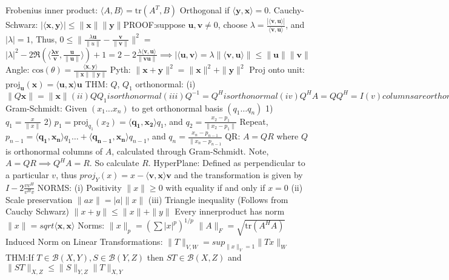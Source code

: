 \documentclass[8pt]{extarticle}
\theoremstyle{definition}
\begin{document}
{Frobenius inner product: $\langle A, B \rangle = \text{tr}(A^T,B)$
Orthogonal if $\langle \mathbf{y}, \mathbf{x} \rangle = 0$.
Cauchy-Schwarz: $|\langle \mathbf{x}, \mathbf{y} \rangle | \leq \|\mathbf{x}\| \|\mathbf{y}\|$PROOF:suppose $\mathbf{u}, \mathbf{v} \neq 0$, choose
$\lambda = \frac{|\langle \mathbf{v}, \mathbf{u} \rangle |}{\langle \mathbf{v}, \mathbf{u} \rangle }$, and $|\lambda| = 1$,
Thus, $0 \leq \| \frac{\lambda \mathbf{u}}{\|u\|} - \frac{\mathbf{v}}{\|\mathbf{v}\|}\|^2 = $
$|\lambda|^2 -2 \Re(\langle \mathbf{\frac{\lambda \mathbf{v}}{\mathbf{v}}},
\frac{\mathbf{u}}{\|\mathbf{u}\|} \rangle ) + 1 = 2 - 2 \frac{\lambda \langle \mathbf{v}, \mathbf{u} \rangle }{\|\mathbf{v}\mathbf{u}\|} \implies |\langle \mathbf{u}, \mathbf{v} \rangle 
= \lambda \| \langle \mathbf{v}, \mathbf{u} \rangle \| \leq \|\mathbf{u}\| \| \mathbf{v}\|$ 
Angle: $ \text{cos}(\theta) = \frac{\langle \mathbf{x}, \mathbf{y} \rangle }{\| \mathbf{x}\| \|\mathbf{y}\|}$ 
Pyth: $\|\mathbf{x}+ \mathbf{y}\|^2 = \|\mathbf{x}\|^2 + \|\mathbf{y}\|^2$
Proj onto unit: $\text{proj}_\mathbf{u}(\mathbf{x}) = \langle \mathbf{u}, \mathbf{x} \rangle \mathbf{u}$
THM: $Q$, $Q_1$ orthonormal: (i) $\|Q \mathbf{x}\| = \|\mathbf{x}\| 
(ii) QQ_1 is orthonormal
(iii) Q^{-1} = Q^H is orthonormal
(iv) Q^HA = QQ^H = I
(v) columns are orthonormal
(vi) |det(Q)| = 1$
Gram-Schmidt: Given $(x_1\dots x_n)$ to get orthonormal basis $(q_1 \dots q_n)$ 1) $q_1 = \frac{x}{\|x\|}$ 
2) $p_1 = \text{proj}_{q_1}(x_2) = \langle \mathbf{q_1}, \mathbf{x_2} \rangle q_1$,
and $q_2 = \frac{x_2 - p_1}{\|x_2 - p_1\|}$
Repeat, $p_{n-1} = \langle \mathbf{q_1}, \mathbf{x_n} \rangle q_1 \dots + \langle \mathbf{q_{n-1}}, \mathbf{x_n} \rangle q_{n-1}$, and $ q_n = \frac{x_n - p_{n-1}}{\|x_n - p_{n-1}}$
QR: $A=QR$ where $Q$ is orthonormal columns of $A$, calculated through Gram-Schmidt.
Note, $A=QR \implies Q^HA=R$. So calculate $R$.
HyperPlane: Defined as perpendicular to a particular $v$, thus $proj_Y(x) = x - \langle \mathbf{v}, \mathbf{x} \rangle \mathbf{v}$ and the transformation is given by $I - 2 \frac{vv^H}{v^Hv}$
NORMS: (i) Positivity $\|x\| \geq 0$ with equality if and only if $x=0$
(ii) Scale preservation $\|ax\| = |a| \|x\|$
(iii) Triangle inequality (Follows from Cauchy Schwarz) $\|x+y\| \leq \|x\|+\|y\|$ Every innerproduct has norm $\|x\| = sqrt{\langle \mathbf{x}, \mathbf{x} \rangle }$
Norms: $\|x\|_p = (\sum |x|^p)^{1/p}$  $\|A\|_F = \sqrt{\text{tr}(A^HA)}$
Induced Norm on Linear Transformations: $\|T\|_{V,W} = sup_{\|x\|_V=1} \|Tx\|_W$
THM:If $T \in \mathscr{B}(X,Y), S\in \mathscr{B}(Y,Z)$ then $ ST \in \mathscr{B}(X,Z)$ and $ \|ST\|_{X,Z} \leq \|S\|_{Y,Z}\|T\|_{X,Y}$
}
\end{document}
